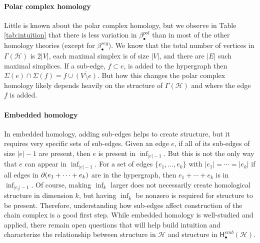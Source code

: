 \documentclass{amsart}
\newcommand{\Hgroup}	     {\mathsf{H}}
\renewcommand{\hom}[2]{\Hgroup_{#2}^{#1}}
\newcommand{\betti}[2]{\beta_{#2}^{#1}}
\renewcommand{\H}{\mathcal{H}}
\newcommand{\pol}{\Gamma}
\newcommand{\bdr}{\mm{\mathrm{\partial}}}
\newcommand {\mm}[1]        {\ifmmode{#1}\else{\mbox{\(#1\)}}\fi}
\begin{document}
\paragraph{\textbf{Polar complex homology}} 
Little is known about the polar complex homology, but we observe in Table \ref{tab:intuition} that there is less variation in $\betti{pol}{\bullet}$ than in most of the other homology theories (except for $\betti{reg}{\bullet}$). We know that the total number of vertices in $\pol(\H)$ is $2|V|$, each maximal simplex is of size $|V|$, and there are $|E|$ such maximal simplices. If a sub-edge, $f \subset e$, is added to the hypergraph then $\Sigma(e) \cap \Sigma(f) = f \cup \overline{(V\setminus e)}$. But how this changes the polar complex homology likely depends heavily on the structure of $\pol(\H)$ and where the edge $f$ is added.
\\
\paragraph{\textbf{Embedded homology}}
In embedded homology, adding sub-edges helps to create structure, but it requires very specific sets of sub-edges. Given an edge $e$, if all of its sub-edges of size $|e|-1$ are present, then $e$ is present in $\inf_{|e|-1}$. But this is not the only way that $e$ can appear in $\inf_{|e|-1}$. For a set of edges $\{e_1, \ldots, e_k\}$ with $|e_1|=\cdots=|e_k|$ if all edges in $\bdr(e_1+\cdots+e_k)$ are in the hypergraph, then $e_1+\cdots+e_k$ is in $\inf_{|e_i|-1}$. Of course, making $\inf_k$ larger does not necessarily create homological structure in dimension $k$, but having $\inf_k$ be nonzero is required for structure to be present. Therefore, understanding how sub-edges affect construction of the chain complex is a good first step. While embedded homology is well-studied and applied, there remain open questions that will help build intuition and characterize the relationship between structure in $\H$ and structure in $\hom{emb}{\bullet}(\H)$.
\\
\end{document}
